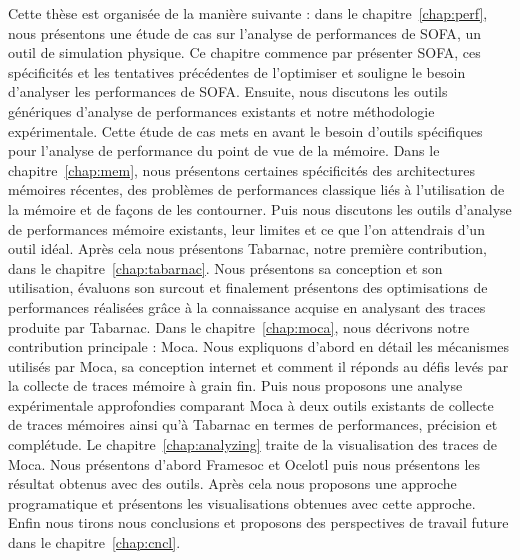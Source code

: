 Cette thèse est organisée de la manière suivante : dans le chapitre~\ref{chap:perf}, nous présentons une étude de cas sur l'analyse de performances de \gls{SOFA}, un outil de simulation physique.
Ce chapitre commence par présenter \gls{SOFA}, ces spécificités et les tentatives précédentes de l'optimiser et souligne le besoin d'analyser les performances de \gls{SOFA}.
Ensuite, nous discutons les outils génériques d'analyse de performances existants et notre méthodologie expérimentale.
Cette étude de cas mets en avant le besoin d'outils spécifiques pour l'analyse de performance du point de vue de la mémoire.
Dans le chapitre~\ref{chap:mem}, nous présentons certaines spécificités des architectures mémoires récentes, des problèmes de performances classique liés à l'utilisation de la mémoire et de façons de les contourner.
Puis nous discutons les outils d'analyse de performances mémoire existants, leur limites et ce que l'on attendrais d'un outil idéal.
Après cela nous présentons \gls{Tabarnac}, notre première contribution, dans le chapitre~\ref{chap:tabarnac}.
Nous présentons sa conception et son utilisation, évaluons son surcout et finalement présentons des optimisations de performances réalisées grâce à la connaissance acquise en analysant des traces produite par \gls{Tabarnac}.
Dans le chapitre~\ref{chap:moca}, nous décrivons notre contribution principale : \gls{Moca}.
Nous expliquons d'abord en détail les mécanismes utilisés par \gls{Moca}, sa conception internet et comment il réponds au défis levés par la collecte de traces mémoire à grain fin.
Puis nous proposons une analyse expérimentale approfondies comparant \gls{Moca} à deux outils existants de collecte de traces mémoires ainsi qu'à \gls{Tabarnac} en termes de performances, précision et complétude.
Le chapitre~\ref{chap:analyzing} traite de la visualisation des traces de \gls{Moca}.
Nous présentons d'abord \gls{Framesoc} et \gls{Ocelotl} puis nous présentons les résultat obtenus avec des outils.
Après cela nous proposons une approche programatique et présentons les visualisations obtenues avec cette approche.
Enfin nous tirons nous conclusions et proposons des perspectives de travail future dans le chapitre~\ref{chap:cncl}.

\glsresetall
